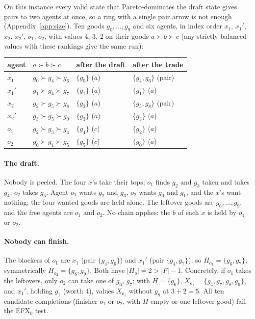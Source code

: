 \documentclass[runningheads,11pt]{llncs}
\newcommand{\efxz}{\texorpdfstring{\mbox{EFX$_0$}}{EFX0}}
\begin{document}
On this instance every valid state that Pareto-dominates the draft state gives pairs to two agents at once, so a ring with a single pair arrow is not enough (Appendix~\ref{app:size}). Ten goods $g_0,\dots,g_9$ and six agents, in index order $x_1$, $x_1'$, $x_2$, $x_2'$, $o_1$, $o_2$, with values $4$, $3$, $2$ on their goods $a\succ b\succ c$ (any strictly balanced values with these rankings give the same run):
\begin{center}
\setlength{\tabcolsep}{6pt}\begin{tabular}{@{}llll@{}}
\toprule
agent & $a\succ b\succ c$ & after the draft & after the trade \\
\midrule
$x_1$ & $g_0\succ g_4\succ g_6$ & $\{g_0\}$ ($a$) & $\{g_4,g_6\}$ (pair) \\
$x_1'$ & $g_1\succ g_4\succ g_7$ & $\{g_1\}$ ($a$) & $\{g_1\}$ ($a$) \\
$x_2$ & $g_2\succ g_5\succ g_8$ & $\{g_2\}$ ($a$) & $\{g_5,g_8\}$ (pair) \\
$x_2'$ & $g_3\succ g_5\succ g_9$ & $\{g_3\}$ ($a$) & $\{g_3\}$ ($a$) \\
$o_1$ & $g_2\succ g_3\succ g_4$ & $\{g_4\}$ ($c$) & $\{g_2\}$ ($a$) \\
$o_2$ & $g_0\succ g_1\succ g_5$ & $\{g_5\}$ ($c$) & $\{g_0\}$ ($a$) \\
\bottomrule
\end{tabular}
\end{center}

\paragraph{The draft.} Nobody is peeled. The four $x$'s take their tops; $o_1$ finds $g_2$ and $g_3$ taken and takes $g_4$; $o_2$ takes $g_5$. Agent $o_1$ wants $g_2$ and $g_3$, $o_2$ wants $g_0$ and $g_1$, and the $x$'s want nothing; the four wanted goods are held alone. The leftover goods are $g_6,\dots,g_9$, and the free agents are $o_1$ and $o_2$. No chain applies: the $b$ of each $x$ is held by $o_1$ or $o_2$.

\paragraph{Nobody can finish.} The blockers of $o_1$ are $x_1$ (pair $\{g_4,g_6\}$) and $x_1'$ (pair $\{g_4,g_7\}$), so $H_{o_1}=\{g_6,g_7\}$; symmetrically $H_{o_2}=\{g_8,g_9\}$. Both have $|H_o|=2>|F|-1$. Concretely, if $o_1$ takes the leftovers, only $o_2$ can take one of $g_6$, $g_7$; with $H=\{g_6\}$, $X_{o_1}=\{g_4,g_7,g_8,g_9\}$, and $x_1'$, holding $g_1$ (worth $4$), values $X_{o_1}$ without $g_8$ at $3+2=5$. All ten candidate completions (finisher $o_1$ or $o_2$, with $H$ empty or one leftover good) fail the \efxz{} test.
\end{document}
